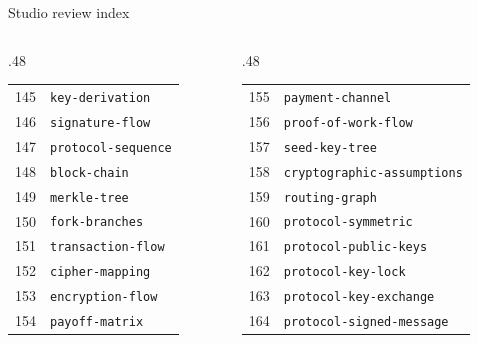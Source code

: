 \documentclass[aspectratio=169]{beamer}
\begin{document}
\begin{frame}{Studio review index}\fontsize{6.5}{9}\selectfont\begin{columns}[T]
\begin{column}{.48\textwidth}\begin{tabular}{rl}
145 & \texttt{key-derivation} \\
146 & \texttt{signature-flow} \\
147 & \texttt{protocol-sequence} \\
148 & \texttt{block-chain} \\
149 & \texttt{merkle-tree} \\
150 & \texttt{fork-branches} \\
151 & \texttt{transaction-flow} \\
152 & \texttt{cipher-mapping} \\
153 & \texttt{encryption-flow} \\
154 & \texttt{payoff-matrix} \\
\end{tabular}\end{column}
\begin{column}{.48\textwidth}\begin{tabular}{rl}
155 & \texttt{payment-channel} \\
156 & \texttt{proof-of-work-flow} \\
157 & \texttt{seed-key-tree} \\
158 & \texttt{cryptographic-assumptions} \\
159 & \texttt{routing-graph} \\
160 & \texttt{protocol-symmetric} \\
161 & \texttt{protocol-public-keys} \\
162 & \texttt{protocol-key-lock} \\
163 & \texttt{protocol-key-exchange} \\
164 & \texttt{protocol-signed-message} \\
\end{tabular}\end{column}
\end{columns}\end{frame}
\end{document}
